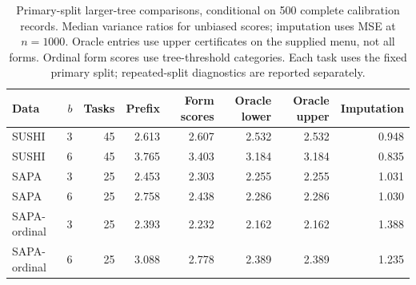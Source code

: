 \begin{table}[t]
\centering
\caption{Primary-split larger-tree comparisons, conditional on 500 complete calibration records. Median variance ratios for unbiased scores; imputation uses MSE at $n=1000$. Oracle entries use upper certificates on the supplied menu, not all forms. Ordinal form scores use tree-threshold categories. Each task uses the fixed primary split; repeated-split diagnostics are reported separately.}
\label{tab:fulldetail}
\small
\setlength{\tabcolsep}{4pt}
\begin{tabular}{lrrrrrrr}
\toprule
Data & $b$ & Tasks & Prefix & Form scores & Oracle lower & Oracle upper & Imputation \\
\midrule
SUSHI & 3 & 45 & 2.613 & 2.607 & 2.532 & 2.532 & 0.948 \\
SUSHI & 6 & 45 & 3.765 & 3.403 & 3.184 & 3.184 & 0.835 \\
SAPA & 3 & 25 & 2.453 & 2.303 & 2.255 & 2.255 & 1.031 \\
SAPA & 6 & 25 & 2.758 & 2.438 & 2.286 & 2.286 & 1.030 \\
SAPA-ordinal & 3 & 25 & 2.393 & 2.232 & 2.162 & 2.162 & 1.388 \\
SAPA-ordinal & 6 & 25 & 3.088 & 2.778 & 2.389 & 2.389 & 1.235 \\
\bottomrule
\end{tabular}
\end{table}
